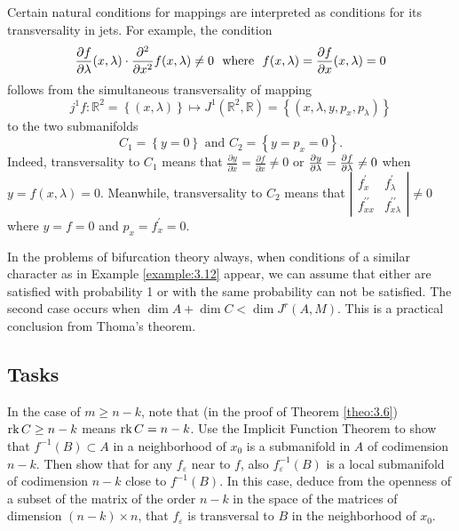\begin{example}\label{example:3.12}
	Certain natural conditions for mappings are interpreted as conditions for its transversality in jets. For example, the condition
	$$
	\frac{\partial f}{\partial \lambda }(x,\lambda )\cdot \frac{\partial ^{2}}{%
		\partial x^{2}}f(x,\lambda )\not=0\text{ \ where \ }f(x,\lambda )=\frac{%
		\partial f}{\partial x}(x,\lambda )=0
	$$
	follows from the simultaneous transversality of mapping
	$$
	j^{1}f:\mathbb{R}^{2}=\left\{ \left( x,\lambda \right) \right\} \longmapsto
	J^{1}(\mathbb{R}^{2},\mathbb{R})=\left\{ \left( x,\lambda
	,y,p_{x},p_{\lambda }\right) \right\}
	$$
	to the two submanifolds $$
	C_{1}=\left\{ y=0\right\} \text{ \ and \ }C_{2}=\left\{ y=p_{x}=0\right\} .
	$$
	Indeed, transversality to $C_{1}$ means that $\frac{\partial
	y}{\partial x}=\frac{\partial f}{\partial x}\not=0$ or $\frac{\partial y}{%
	\partial \lambda }=\frac{\partial f}{\partial \lambda }\not=0$ when $y=f(x,\lambda )=0.$
	Meanwhile, transversality to $C_{2}$ means that $\left\vert
	\begin{array}{ll}
	f_{x}^{\prime } & f_{\lambda }^{\prime } \\
	f_{xx}^{\prime \prime } & f_{x\lambda }^{\prime \prime }%
	\end{array}%
	\right\vert \not=0$ where $y=f=0$ and $p_{x}=f_{x}^{\prime }=0.$
\end{example}
\bigskip
In the problems of bifurcation theory always, when conditions of a similar character as in Example \ref{example:3.12} appear, we can assume that either are satisfied with probability 1 or with the same probability can not be satisfied. The second case occurs when $\dim A+\dim C<\dim J^{r}(A,M).$ This is a practical conclusion from Thoma's theorem.

\subsection*{Tasks}
\begin{task}
	In the case of $m\geq n-k$, note that (in the proof of Theorem \ref{theo:3.6}) $\textrm{rk\,} C\geq n-k$ means $\textrm{rk\,} C=n-k$. Use the Implicit Function Theorem to show that $f^{-1}(B)\subset A$ in a neighborhood of $x_{0}$ is a submanifold in $A$ of codimension $n - k$. Then show that for any $f_{\varepsilon }$ near to $f$, also $f_{\varepsilon }^{-1}(B)$ is a local submanifold of codimension $n-k$ close to $f^{-1}(B)$. In this case, deduce from the openness of a subset of the matrix of the order $n-k$ in the space of the matrices of dimension $(n-k)\times n$, that $f_{\varepsilon }$ is transversal to $B$ in the neighborhood of $x_0$.
\end{task}


